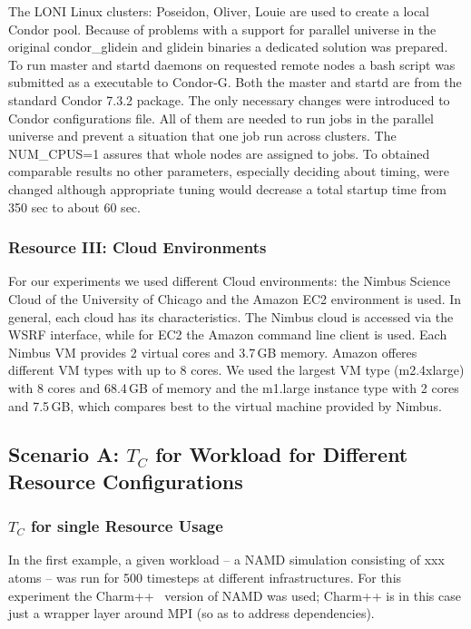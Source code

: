 \documentclass[conference,final]{IEEEtran}
\newcommand{\tc}{$T_{C}$ }
\begin{document}
The LONI Linux clusters: Poseidon, Oliver, Louie are used to create a local
Condor pool. Because of problems with a support for parallel universe in the
original condor\_glidein and glidein binaries a dedicated solution was prepared.
To run master and startd daemons on requested remote nodes a bash script was
submitted as a executable to Condor-G. Both the master and startd are from the
standard Condor 7.3.2 package. The only necessary changes were introduced to
Condor configurations file. All of them are needed to run jobs in the parallel
universe and prevent a situation that one job run across clusters. The NUM\_CPUS=1
assures that whole nodes are assigned to jobs.
To obtained comparable results no other parameters, especially deciding about
timing, were changed although appropriate tuning would decrease a total
startup time from 350 sec to about 60 sec.


\subsubsection*{Resource III: Cloud Environments}

For our experiments we used different Cloud environments: 
the Nimbus Science Cloud of the University of Chicago and the 
Amazon EC2 environment is used. In general, each cloud has 
its characteristics. The Nimbus cloud is accessed via the WSRF
interface, while for EC2 the Amazon command line 
client is used. Each Nimbus VM provides 2 virtual cores and 3.7\,GB memory. 
Amazon offeres different VM types with up to 8 cores. We used 
the largest VM type (m2.4xlarge) with 8 cores and 68.4\,GB of memory
and the m1.large instance type with 2 cores and 7.5\,GB, which compares
best to the virtual machine provided by Nimbus. 

\subsection{Scenario A: \tc for Workload for Different Resource Configurations}

\subsubsection{\tc for single Resource Usage}

In the first example, a given workload -- a NAMD simulation consisting
of xxx atoms -- was run for 500 timesteps at different
infrastructures. For this experiment the Charm++~\cite{871085} version
of NAMD was used; Charm++ is in this case just a wrapper layer around
MPI (so as to address dependencies).
\end{document}
